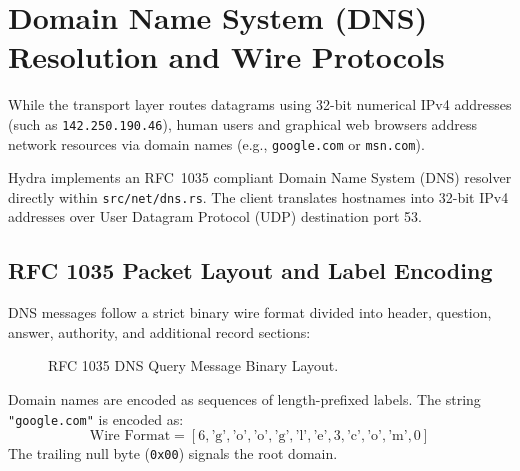 \section{Domain Name System (DNS) Resolution and Wire Protocols}
\label{sec:dns_deep}

While the transport layer routes datagrams using 32-bit numerical IPv4 addresses (such as \texttt{142.250.190.46}), human users and graphical web browsers address network resources via domain names (e.g., \texttt{google.com} or \texttt{msn.com}).

Hydra implements an RFC~1035 compliant Domain Name System (DNS) resolver directly within \texttt{src/net/dns.rs}. The client translates hostnames into 32-bit IPv4 addresses over User Datagram Protocol (UDP) destination port 53.

\subsection{RFC 1035 Packet Layout and Label Encoding}

DNS messages follow a strict binary wire format divided into header, question, answer, authority, and additional record sections:

\begin{figure}[htbp]
\centering
{}
\caption{RFC 1035 DNS Query Message Binary Layout.}
\label{fig:dns_wire_format}
\end{figure}

Domain names are encoded as sequences of length-prefixed labels. The string \texttt{"google.com"} is encoded as:
\begin{equation}
\text{Wire Format} = [6, \text{'g'}, \text{'o'}, \text{'o'}, \text{'g'}, \text{'l'}, \text{'e'}, 3, \text{'c'}, \text{'o'}, \text{'m'}, 0]
\end{equation}
The trailing null byte (\texttt{0x00}) signals the root domain.


